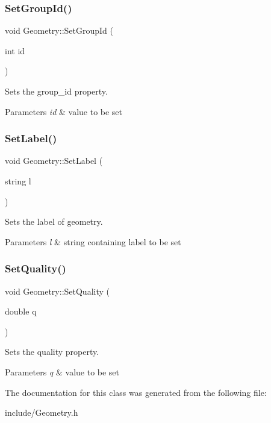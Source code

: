 \subsubsection{\texorpdfstring{Set\+Group\+Id()}{SetGroupId()}}
{\footnotesize\ttfamily void Geometry\+::\+Set\+Group\+Id (\begin{DoxyParamCaption}\item[{int}]{id }\end{DoxyParamCaption})}

Sets the group\+\_\+id property. 
\begin{DoxyParams}{Parameters}
{\em id} & value to be set \\
\hline
\end{DoxyParams}
\hypertarget{class_geometry_aae7622e0d7dedc29426a671745837101}{}\label{class_geometry_aae7622e0d7dedc29426a671745837101} 
\subsubsection{\texorpdfstring{Set\+Label()}{SetLabel()}}
{\footnotesize\ttfamily void Geometry\+::\+Set\+Label (\begin{DoxyParamCaption}\item[{string}]{l }\end{DoxyParamCaption})}

Sets the label of geometry. 
\begin{DoxyParams}{Parameters}
{\em l} & string containing label to be set \\
\hline
\end{DoxyParams}
\hypertarget{class_geometry_a79fca7521afb70ed250bc397786f453a}{}\label{class_geometry_a79fca7521afb70ed250bc397786f453a} 
\subsubsection{\texorpdfstring{Set\+Quality()}{SetQuality()}}
{\footnotesize\ttfamily void Geometry\+::\+Set\+Quality (\begin{DoxyParamCaption}\item[{double}]{q }\end{DoxyParamCaption})}

Sets the quality property. 
\begin{DoxyParams}{Parameters}
{\em q} & value to be set \\
\hline
\end{DoxyParams}


The documentation for this class was generated from the following file\+:\begin{DoxyCompactItemize}
\item 
include/Geometry.\+h\end{DoxyCompactItemize}
